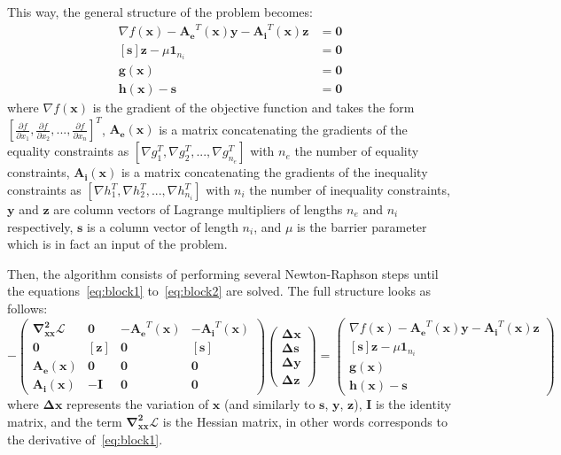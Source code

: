 \documentclass{article}
\begin{document}
This way, the general structure of the problem becomes: 
\begin{align}
    \label{eq:block1}
\nabla f(\bm{x}) - \bm{A_e}^T(\bm{x}) \bm{y} - \bm{A_i}^T(\bm{x}) \bm{z} &= \bm{0} \\
[\bm{s}] \bm{z} - \mu \bm{1}_{n_i} &= \bm{0} \\
\bm{g}(\bm{x}) &= \bm{0} \\
\bm{h}(\bm{x}) - \bm{s} &= \bm{0}
\label{eq:block2}
\end{align}
where $\nabla f(\bm{x})$ is the gradient of the objective function and takes the form $[\frac{\partial f}{\partial x_1}, \frac{\partial f}{\partial x_2}, ..., \frac{\partial f}{\partial x_n}]^T$, $\bm{A_e} (\bm{x})$ is a matrix concatenating the gradients of the equality constraints as $[\nabla g_1^T, \nabla g_2^T, ..., \nabla g_{n_e}^T]$ with $n_e$ the number of equality constraints, $\bm{A_i} (\bm{x})$ is a matrix concatenating the gradients of the inequality constraints as $[\nabla h_1^T, \nabla h_2^T, ..., \nabla h_{n_i}^T]$ with $n_i$ the number of inequality constraints, $\bm{y}$ and $\bm{z}$ are column vectors of Lagrange multipliers of lengths $n_e$ and $n_i$ respectively, $\bm{s}$ is a column vector of length $n_i$, and $\mu$ is the barrier parameter which is in fact an input of the problem.

Then, the algorithm consists of performing several Newton-Raphson steps until the equations~\ref{eq:block1} to~\ref{eq:block2} are solved. The full structure looks as follows:
\begin{equation}
    - \begin{pmatrix}
        \bm{\nabla^2_{xx}\mathcal{L}} & \bm{0} & -\bm{A_e}^T(\bm{x}) & -\bm{A_i}^T(\bm{x}) \\ 
        \bm{0} & [\bm{z}] & \bm{0} & [\bm{s}] \\
        \bm{A_e}(\bm{x}) & \bm{0} & \bm{0} & \bm{0} \\
        \bm{A_i}(\bm{x}) & -\bm{I} & \bm{0} & \bm{0}
    \end{pmatrix}
    \begin{pmatrix}
        \bm{\Delta x} \\
        \bm{\Delta s} \\
        \bm{\Delta y} \\
        \bm{\Delta z}
    \end{pmatrix} = 
    \begin{pmatrix}
        \nabla f(\bm{x}) - \bm{A_e}^T (\bm{x}) \bm{y} - \bm{A_i}^T (\bm{x}) \bm{z} \\
[\bm{s}] \bm{z} - \mu \bm{1}_{n_i} \\
\bm{g}(\bm{x}) \\
\bm{h}(\bm{x}) - \bm{s}
    \end{pmatrix}
\end{equation}
where $\bm{\Delta x}$ represents the variation of $\bm{x}$ (and similarly to $\bm{s}$, $\bm{y}$, $\bm{z}$), $\bm{I}$ is the identity matrix, and the term  $\bm{\nabla^2_{xx}\mathcal{L}}$ is the Hessian matrix, in other words corresponds to the derivative of~\eqref{eq:block1}.
\end{document}

